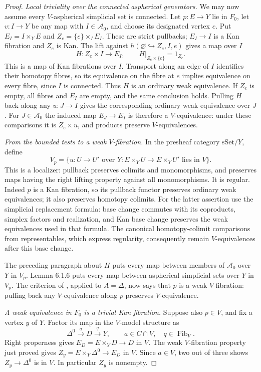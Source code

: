 \begin{proof}
\emph{Local triviality over the connected aspherical generators.}
We may now assume every $V$-aspherical simplicial set is connected.  Let
$p:E\to Y$ lie in $F_0$, let $v:I\to Y$ be any map with
$I\in\mathcal A_0$, and choose its designated vertex $e$.  Put
$E_I=I\times_YE$ and $Z_e=\{e\}\times_IE_I$.  These are strict pullbacks;
$E_I\to I$ is a Kan fibration and $Z_e$ is Kan.  The lift against
$h(\varnothing\hookrightarrow Z_e,I,e)$ gives a map over $I$
\[
 H:Z_e\times I\longrightarrow E_I,
 \qquad H|_{Z_e\times\{e\}}=1_{Z_e}.
\]
This is a map of Kan fibrations over $I$.  Transport along an edge of $I$
identifies their homotopy fibres, so its equivalence on the fibre at $e$
implies equivalence on every fibre, since $I$ is connected.  Thus $H$ is
an ordinary weak equivalence.  If $Z_e$ is empty, all fibres and $E_I$ are
empty, and the same conclusion holds.  Pulling $H$ back along any
$u:J\to I$ gives the corresponding ordinary weak equivalence over $J$.
For $J\in\mathcal A_0$ the induced map $E_J\to E_I$ is therefore a
$V$-equivalence: under these comparisons it is $Z_e\times u$, and products
preserve $V$-equivalences.

\emph{From the bounded tests to a weak $V$-fibration.}
In the presheaf category $\mathrm{sSet}/Y$, define
\[
 V_p=\{u:U\to U'\text{ over }Y:
          E\times_YU\to E\times_YU'\text{ lies in }V\}.
\]
This is a localizer: pullback preserves colimits and monomorphisms, and
preserves maps having the right lifting property against all monomorphisms.
It is regular.  Indeed $p$ is a Kan fibration, so its pullback functor
preserves ordinary weak equivalences; it also preserves homotopy colimits.
For the latter assertion use the simplicial replacement formula: base
change commutes with its coproducts, simplex factors and realization, and
Kan base change preserves the weak equivalences used in that formula.
The canonical homotopy-colimit comparisons from representables, which
express regularity, consequently remain $V$-equivalences after this base
change.

The preceding paragraph about $H$ puts every map between members of
$\mathcal A_0$ over $Y$ in $V_p$.  Lemma 6.1.6 puts every map between
aspherical simplicial sets over $Y$ in $V_p$.  The criterion of
\citet[Proposition 6.1.1]{Cisinski2006B}, applied to $A=\Delta$, now says
that $p$ is a weak $V$-fibration: pulling back any $V$-equivalence along
$p$ preserves $V$-equivalence.

\emph{A weak equivalence in $F_0$ is a trivial Kan fibration.}
Suppose also $p\in V$, and fix a vertex $y$ of $Y$.  Factor its map in the
$V$-model structure as
\[
 \Delta^0\xrightarrow{a}D\xrightarrow{q}Y,
 \qquad a\in C\cap V,\quad q\in\operatorname{Fib}_V.
\]
Right properness gives $E_D=E\times_YD\to D$ in $V$.  The weak
$V$-fibration property just proved gives
$Z_y=E\times_Y\Delta^0\to E_D$ in $V$.  Since $a\in V$, two out of three
shows $Z_y\to\Delta^0$ is in $V$.  In particular $Z_y$ is nonempty.


\end{proof}
